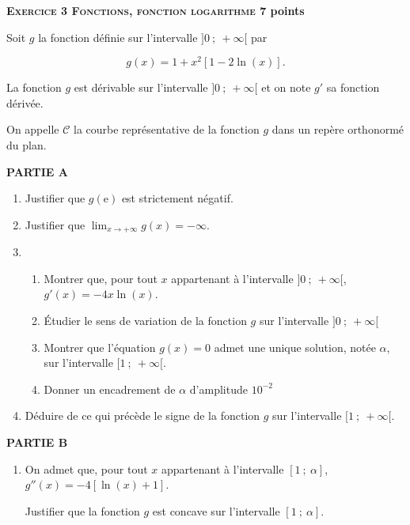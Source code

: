 \documentclass[11pt]{article}
\begin{document}
\bigskip

\textbf{\textsc{Exercice 3 Fonctions, fonction logarithme} \hfill 7 points}

\medskip

Soit $g$ la fonction définie sur l'intervalle $]0~;~+\infty[$ par 

\[g(x) = 1+ x^2[1 - 2 \ln (x)].\]

La fonction $g$ est dérivable sur l'intervalle $]0~;~+\infty[$ et on note $g'$ sa fonction dérivée.

On appelle $\mathcal{C}$ la courbe représentative de la fonction $g$ dans un repère orthonormé du plan.

\medskip

\textbf{PARTIE A}

\medskip

\begin{enumerate}
\item Justifier que $g(\text{e})$ est strictement négatif.
\item Justifier que $\displaystyle\lim_{x \to + \infty} g(x) = - \infty$.
\item 
	\begin{enumerate}
		\item Montrer que, pour tout $x$ appartenant à l'intervalle $]0~;~+\infty[$,\: $g'(x) = -4x \ln (x)$.
		\item Étudier le sens de variation de la fonction $g$ sur l'intervalle $]0~;~+\infty[$ 
		\item Montrer que l'équation $g(x) = 0$ admet une unique solution, notée $\alpha$, sur l'intervalle $[1~;~+\infty[$.
		\item Donner un encadrement de $\alpha$ d'amplitude $10^{-2}$
	\end{enumerate}
\item Déduire de ce qui précède le signe de la fonction $g$ sur l'intervalle $[1~;~+\infty[$.
\end{enumerate}

\medskip

\textbf{PARTIE B}

\medskip

\begin{enumerate}
\item On admet que, pour tout $x$ appartenant à l'intervalle $[1~;~\alpha]$, $g''(x) = - 4[\ln (x) + 1]$.

Justifier que la fonction $g$ est concave sur l'intervalle $[1~;~\alpha]$.
\end{enumerate}
\end{document}

